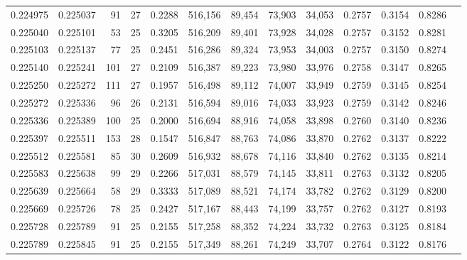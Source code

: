 \begin{tabular}{rrrrrrrrrrrrr}
0.224975 & 0.225037 &  91 &  27 &                                     0.2288 & 516,156 &  89,454 &  73,903 &  34,053 & 0.2757 & 0.3154 & 0.8286 \\
0.225040 & 0.225101 &  53 &  25 &                                     0.3205 & 516,209 &  89,401 &  73,928 &  34,028 & 0.2757 & 0.3152 & 0.8281 \\
0.225103 & 0.225137 &  77 &  25 &                                     0.2451 & 516,286 &  89,324 &  73,953 &  34,003 & 0.2757 & 0.3150 & 0.8274 \\
0.225140 & 0.225241 & 101 &  27 &                                     0.2109 & 516,387 &  89,223 &  73,980 &  33,976 & 0.2758 & 0.3147 & 0.8265 \\
0.225250 & 0.225272 & 111 &  27 &                                     0.1957 & 516,498 &  89,112 &  74,007 &  33,949 & 0.2759 & 0.3145 & 0.8254 \\
0.225272 & 0.225336 &  96 &  26 &                                     0.2131 & 516,594 &  89,016 &  74,033 &  33,923 & 0.2759 & 0.3142 & 0.8246 \\
0.225336 & 0.225389 & 100 &  25 &                                     0.2000 & 516,694 &  88,916 &  74,058 &  33,898 & 0.2760 & 0.3140 & 0.8236 \\
0.225397 & 0.225511 & 153 &  28 &                                     0.1547 & 516,847 &  88,763 &  74,086 &  33,870 & 0.2762 & 0.3137 & 0.8222 \\
0.225512 & 0.225581 &  85 &  30 &                                     0.2609 & 516,932 &  88,678 &  74,116 &  33,840 & 0.2762 & 0.3135 & 0.8214 \\
0.225583 & 0.225638 &  99 &  29 &                                     0.2266 & 517,031 &  88,579 &  74,145 &  33,811 & 0.2763 & 0.3132 & 0.8205 \\
0.225639 & 0.225664 &  58 &  29 &                                     0.3333 & 517,089 &  88,521 &  74,174 &  33,782 & 0.2762 & 0.3129 & 0.8200 \\
0.225669 & 0.225726 &  78 &  25 &                                     0.2427 & 517,167 &  88,443 &  74,199 &  33,757 & 0.2762 & 0.3127 & 0.8193 \\
0.225728 & 0.225789 &  91 &  25 &                                     0.2155 & 517,258 &  88,352 &  74,224 &  33,732 & 0.2763 & 0.3125 & 0.8184 \\
0.225789 & 0.225845 &  91 &  25 &                                     0.2155 & 517,349 &  88,261 &  74,249 &  33,707 & 0.2764 & 0.3122 & 0.8176 \\

\end{tabular}
